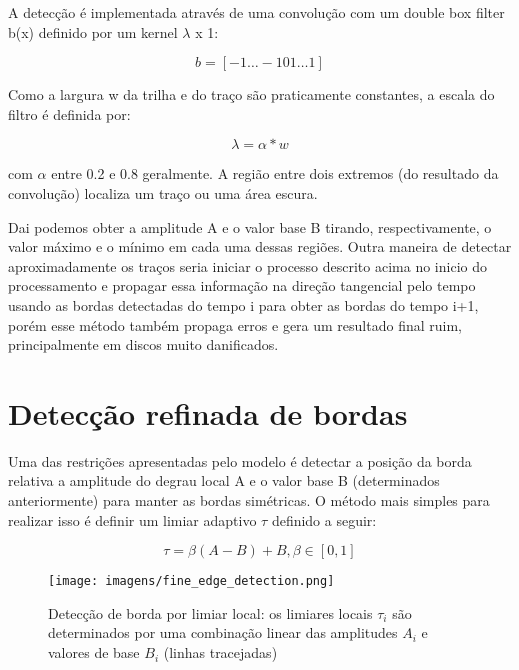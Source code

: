 \documentclass[
	12pt,				%
	openright,			%
	twoside,			%
	a4paper,			%
	english,			%
	french,				%
	spanish,			%
	brazil				%
	]{abntex2}
\begin{document}
A detecção é implementada através de uma convolução com um double box filter b(x) definido por um kernel $\lambda$ x 1:

	\begin{equation}
	 b = [-1 \dots{} -1 0 1 \dots{} 1]
	\end{equation}

Como a largura w da trilha e do traço são praticamente constantes, a escala do filtro é definida por:

\begin{equation}
    \lambda = \alpha*w
\end{equation}

com $\alpha$ entre 0.2 e 0.8 geralmente.
A região entre dois extremos (do resultado da convolução) localiza um traço ou uma área escura.


Dai podemos obter a amplitude A e o valor base B tirando, respectivamente, o valor máximo e o mínimo em cada uma dessas regiões.
Outra maneira de detectar aproximadamente os traços seria iniciar o processo descrito acima no inicio do processamento e propagar essa informação na direção tangencial pelo tempo usando as bordas detectadas do tempo i para obter as bordas do tempo i+1, porém esse método também propaga erros e gera um resultado final ruim, principalmente em discos muito danificados.

\section{Detecção refinada de bordas}\label{sec:detec_fina}
Uma das restrições apresentadas pelo modelo é detectar a posição da borda relativa a amplitude do degrau local A e o valor base B (determinados anteriormente) para manter as bordas simétricas. O método mais simples para realizar isso é definir um limiar adaptivo $\tau$ definido a seguir:

\begin{equation}
\tau = \beta(A - B) + B, \beta \in [0,1]
\end{equation}

\begin{figure}[hbtp]
\centering
\texttt{[image: imagens/fine\_edge\_detection.png]}
\caption{Detecção de borda por limiar local:  os limiares locais $\tau_{i}$ são determinados por uma combinação linear das amplitudes $A_{i}$ e valores de base $B_{i}$ (linhas tracejadas)}
\end{figure}
\end{document}
